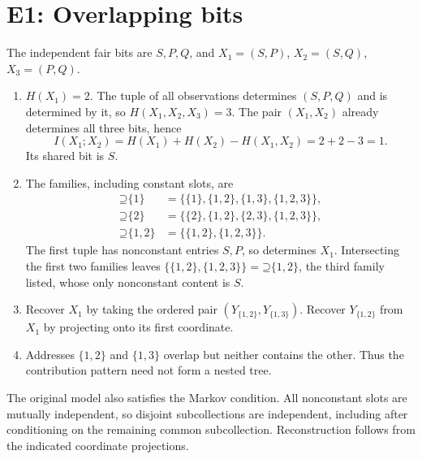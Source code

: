\documentclass[11pt]{article}
\newcommand{\Up}{\mathord{\supseteq}}
\begin{document}
\section{E1: Overlapping bits}
\label{sec:e1}
The independent fair bits are $S,P,Q$, and
$X_1=(S,P)$, $X_2=(S,Q)$, $X_3=(P,Q)$.
\begin{enumerate}[label=(\alph*)]
\item $H(X_1)=2$. The tuple of all observations determines $(S,P,Q)$ and is
determined by it, so $H(X_1,X_2,X_3)=3$.
The pair $(X_1,X_2)$ already determines all three bits, hence
\[
 I(X_1;X_2)=H(X_1)+H(X_2)-H(X_1,X_2)=2+2-3=1.
\]
Its shared bit is $S$.
\item The families, including constant slots, are
\[
\begin{split}
 \Up\{1\}&=\{\{1\},\{1,2\},\{1,3\},\{1,2,3\}\},\\
 \Up\{2\}&=\{\{2\},\{1,2\},\{2,3\},\{1,2,3\}\},\\
 \Up\{1,2\}&=\{\{1,2\},\{1,2,3\}\}.
\end{split}
\]
The first tuple has nonconstant entries $S,P$, so determines $X_1$.
Intersecting the first two families leaves $\{\{1,2\},\{1,2,3\}\}=\Up\{1,2\}$,
the third family listed, whose only nonconstant content is $S$.
\item Recover $X_1$ by taking the ordered pair
$(Y_{\{1,2\}},Y_{\{1,3\}})$. Recover $Y_{\{1,2\}}$ from $X_1$ by
projecting onto its first coordinate.
\item Addresses $\{1,2\}$ and $\{1,3\}$ overlap but neither contains the
other. Thus the contribution pattern need not form a nested tree.
\end{enumerate}
The original model also satisfies the Markov condition. All nonconstant slots
are mutually independent, so disjoint subcollections are independent, including
after conditioning on the remaining common subcollection. Reconstruction follows from the indicated coordinate projections.
\end{document}

